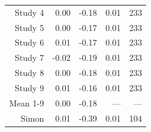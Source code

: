 \begin{table}[!h]
{\begin{tabular}[t]{rrrrr}
\hspace{1em}Study 4 & 0.00 & -0.18 & 0.01 & 233\\
\hspace{1em}Study 5 & 0.00 & -0.17 & 0.01 & 233\\
\hspace{1em}Study 6 & 0.01 & -0.17 & 0.01 & 233\\
\hspace{1em}Study 7 & -0.02 & -0.19 & 0.01 & 233\\
\hspace{1em}Study 8 & 0.00 & -0.18 & 0.01 & 233\\
\hspace{1em}Study 9 & 0.01 & -0.16 & 0.01 & 233\\
\hspace{1em}Mean 1-9 & 0.00 & -0.18 & --- & ---\\
\hspace{1em}Simon & 0.01 & -0.39 & 0.01 & 104\\
\bottomrule
\end{tabular}}
\end{table}
